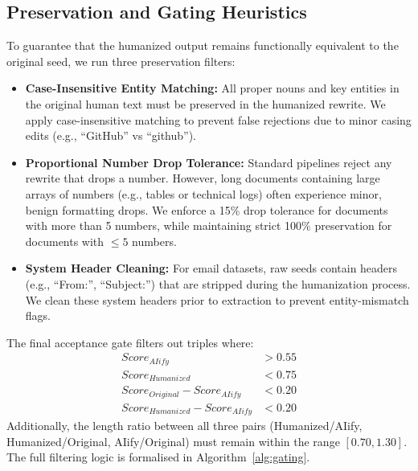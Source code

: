 \documentclass{article}
\begin{document}
\subsection{Preservation and Gating Heuristics}
To guarantee that the humanized output remains functionally equivalent to the original seed, we run three preservation filters:
\begin{itemize}
    \item \textbf{Case-Insensitive Entity Matching:} All proper nouns and key entities in the original human text must be preserved in the humanized rewrite. We apply case-insensitive matching to prevent false rejections due to minor casing edits (e.g., ``GitHub'' vs ``github'').
    \item \textbf{Proportional Number Drop Tolerance:} Standard pipelines reject any rewrite that drops a number. However, long documents containing large arrays of numbers (e.g., tables or technical logs) often experience minor, benign formatting drops. We enforce a 15\% drop tolerance for documents with more than 5 numbers, while maintaining strict 100\% preservation for documents with $\le 5$ numbers.
    \item \textbf{System Header Cleaning:} For email datasets, raw seeds contain headers (e.g., ``From:'', ``Subject:'') that are stripped during the humanization process. We clean these system headers prior to extraction to prevent entity-mismatch flags.
\end{itemize}

The final acceptance gate filters out triples where:
\begin{align*}
    Score_{AIify} &> 0.55 \\
    Score_{Humanized} &< 0.75 \\
    Score_{Original} - Score_{AIify} &< 0.20 \\
    Score_{Humanized} - Score_{AIify} &< 0.20
\end{align*}
Additionally, the length ratio between all three pairs (Humanized/AIify, Humanized/Original, AIify/Original) must remain within the range $[0.70, 1.30]$. The full filtering logic is formalised in Algorithm~\ref{alg:gating}.
\end{document}
